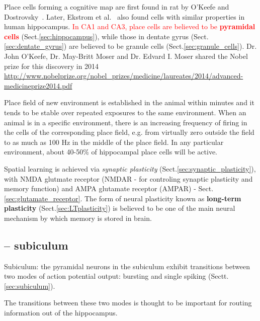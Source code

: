 Place cells forming a cognitive map  are first found
in rat by O'Keefe and Dostrovsky~\cite{keefe1971hsm}. Later, Ekstrom et
al.~\cite{ekstrom2003hsn} also found cells with similar properties in human
hippocampus. \textcolor{red}{In CA1 and CA3, place cells are believed to be
{\bf pyramidal cells}} (Sect.\ref{sec:hippocampus}), while those in dentate
gyrus (Sect.\ref{sec:dentate_gyrus}) are believed to be granule cells
(Sect.\ref{sec:granule_cells}). Dr. John O'Keefe, Dr. May-Britt Moser and Dr.
Edvard I. Moser shared the Nobel prize for this discovery in 2014
\url{http://www.nobelprize.org/nobel_prizes/medicine/laureates/2014/advanced-medicineprize2014.pdf}
 
Place field of new environment is established in the animal within minutes and
it tends to be stable over repeated exposures to the same environment.  When an
animal is in a specific environment, there is an increasing frequency of firing
in the cells of the corresponding place field, e.g. from virtually zero outside
the field to as much as 100 Hz in the middle of the place field.
In any particular environment, about 40-50\% of hippocampal place cells will be
active.  

Spatial learning is achieved via {\it synaptic plasticity}
(Sect.\ref{sec:synaptic_plasticity}), with NMDA glutmate receptor (NMDAR - for
controling synaptic plasticity and memory function) and AMPA glutamate receptor
(AMPAR) - Sect.\ref{sec:glutamate_receptor}. The form of neural plasticity known
as {\bf long-term plasticity} (Sect.\ref{sec:LTplasticity}) is believed to be
one of the main neural mechanism by which memory is stored in brain.


\subsection{-- subiculum}

Subiculum: the pyramidal neurons in the subiculum exhibit transitions between
two modes of action potential output: bursting and single spiking
(Sectt.\ref{sec:subiculum}).
  
The transitions between these two modes is thought to be important for routing
information out of the hippocampus.


